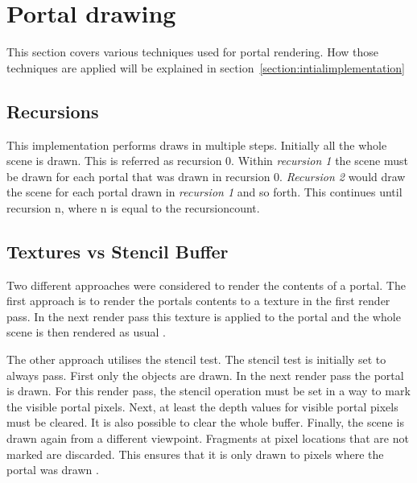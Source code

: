 \section{Portal drawing}
\label{section:portaldrawing}

This section covers various techniques used for portal rendering. How those techniques are applied will be explained in section~\ref{section:intialimplementation}

\subsection{Recursions}


This implementation performs draws in multiple steps. Initially all the whole scene is drawn. This is referred as recursion 0. Within \textit{recursion 1} the scene must be drawn for each portal that was drawn in recursion 0. \textit{Recursion 2} would draw the scene for each portal drawn in \textit{recursion 1} and so forth. This continues until recursion n, where n is equal to the \gls{recursioncount}.


\subsection{Textures vs Stencil Buffer}
\label{section:textursVsStencil}
Two different approaches were considered to render the contents of a portal. The first approach is to render the portals contents to a texture in the first render pass. In the next render pass this texture is applied to the portal and the whole scene is then rendered as usual \cite{schmalstieg:1999:sewing, lecture:portalProblems}.

The other approach utilises the stencil test. The stencil test is initially set to always pass. First only the objects are drawn. In the next render pass the portal is drawn. For this render pass, the stencil operation must be set in a way to mark the visible portal pixels. Next, at least the depth values for visible portal pixels must be cleared. It is also possible to clear the whole buffer. Finally, the scene is drawn again from a different viewpoint. Fragments at pixel locations that are not marked are discarded. This ensures that it is only drawn to pixels where the portal was drawn \cites{schmalstieg:1999:sewing, lowe:2005:technique, lecture:portalProblems}.


